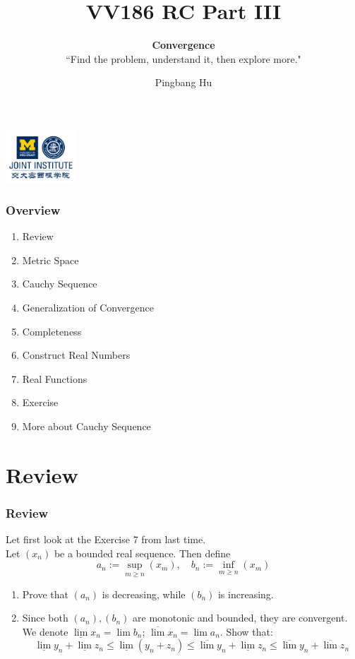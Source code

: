 \documentclass[12pt, t]{beamer}
\title{VV186 RC Part III}
\subtitle{\textbf{Convergence}\\``Find the problem, understand it, then explore more."}
\institute[UM-SJTU JI]{University of Michigan-Shanghai Jiao Tong University Joint Institute}
\author{Pingbang Hu}
\begin{document}
\begin{frame}
    \titlepage
    \begin{center}
        \includegraphics[height=2cm]{Figures/logo/logo2.png}
    \end{center}
\end{frame}

\begin{frame}
    \frametitle{Overview}
    \begin{enumerate}
        \item Review
        \item Metric Space
        \item Cauchy Sequence
        \item Generalization of Convergence
        \item Completeness
        \item Construct Real Numbers
        \item Real Functions
        \item Exercise
        \item More about Cauchy Sequence
    \end{enumerate}
\end{frame}

\section{Review}
\begin{frame}
    \frametitle{Review}
Let first look at the Exercise 7 from last time. \\
\vspace{1em}
    Let $(x_n)$ be a bounded real sequence. Then define
\begin{equation*}
     a_n:=\sup_{m\geq n}(x_m),\quad b_n:=\inf_{m\geq n}(x_m) 
\end{equation*}

\begin{enumerate}
    \item Prove that $(a_n)$ is decreasing, while $(b_n)$ is increasing.
    \item Since both $(a_n),(b_n)$ are monotonic and bounded, they are convergent. 
        We denote $\underline{\lim} x_n=\lim b_n$; $\overline{\lim}x_n=\lim a_n$. Show that:
        \begin{equation*}
            \underline{\lim}y_n+\underline{\lim}z_n\leq \underline{\lim} (y_n+z_n)\leq\overline{\lim}y_n+\underline{\lim}z_n\leq\overline{\lim}y_n+\overline{\lim}z_n
        \end{equation*}
\end{enumerate}

\end{frame}
\end{document}
